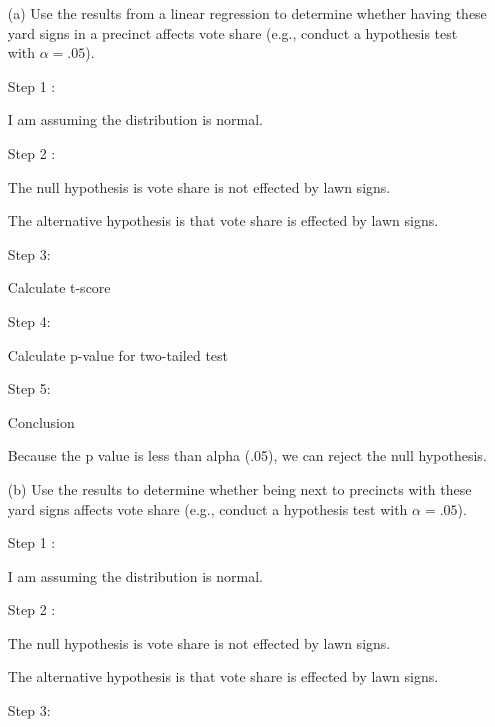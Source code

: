 \documentclass[12pt,letterpaper]{article}
\begin{document}
\vspace{.5cm}
\begin{enumerate}
	\item [(a)] Use the results from a linear regression to determine whether having these yard signs in a precinct affects vote share (e.g., conduct a hypothesis test with $\alpha = .05$).
	\vspace{.5cm}
	
	Step 1 : 
	
   I am assuming the distribution is normal.
   
   \vspace{.5cm}
   Step 2 :
   
   The null hypothesis is vote share is not effected by lawn signs.
   
   The alternative hypothesis is that vote share is effected by lawn signs.
  
	\newpage		
	Step 3: 
	
	Calculate t-score 
	
		
		
		   \vspace{.5cm}
	Step 4:
	
	Calculate p-value for two-tailed test
	
	
	
	   \vspace{.5cm}
	Step 5: 
	
	Conclusion
	
	Because the p value is less than alpha (.05), we can reject
	 the null hypothesis.
	\vspace{1cm}
	\item [(b)]  Use the results to determine whether being
	next to precincts with these yard signs affects vote
	share (e.g., conduct a hypothesis test with $\alpha = .05$).
	
	\vspace{.5cm}
	
	Step 1 : 
	
	I am assuming the distribution is normal.
	
	\vspace{.5cm}
	Step 2 :
	
 The null hypothesis is vote share is not effected by lawn signs.
 
The alternative hypothesis is that vote share is effected by lawn signs.

		\vspace{.5cm}
	Step 3: 
	

\end{enumerate}
\end{document}
